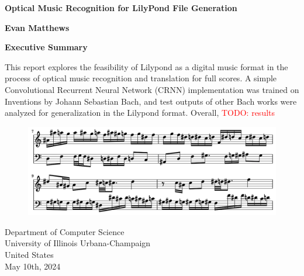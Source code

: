 \documentclass[review,sigconf]{acmart}
\newcommand{\todo}[1]{\textcolor{red}{TODO: #1}}
\begin{document}
\begin{titlepage}
    \begin{center}
        \vspace*{1cm}
            
        \Huge
        \textbf{Optical Music Recognition for LilyPond File Generation}
            
        \vspace{0.5cm}
        \LARGE
            
        \vspace{0.5cm}
            
        \textbf{Evan Matthews}

        \vspace{0.9cm}
		\textbf{Executive Summary}

		\vspace{0.5cm}
		This report explores the feasibility of Lilypond as a digital music format in the process of optical music recognition and translation for full scores.
		A simple Convolutional Recurrent Neural Network (CRNN) implementation was trained on Inventions by Johann Sebastian Bach, and test outputs of other Bach works were analyzed for generalization in the Lilypond format.
		Overall, \todo{results} 

		\begin{figure}
			\centering
			\includegraphics[width = .8\linewidth]{./figures/cover.png}
		\end{figure}

        \vfill
            
        \vspace{0.8cm}
            
        \Large
        Department of Computer Science\\
        University of Illinois Urbana-Champaign\\
        United States\\
        May 10th, 2024
            
    \end{center}
\end{titlepage}
\end{document}
